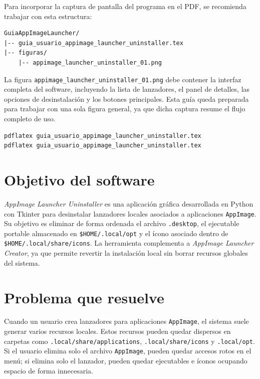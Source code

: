 \documentclass[11pt,a4paper]{article}
\begin{document}
Para incorporar la captura de pantalla del programa en el PDF, se recomienda trabajar con esta estructura:

\begin{lstlisting}[style=textstyle]
GuiaAppImageLauncher/
|-- guia_usuario_appimage_launcher_uninstaller.tex
|-- figuras/
    |-- appimage_launcher_uninstaller_01.png
\end{lstlisting}

La figura \texttt{appimage\_launcher\_uninstaller\_01.png} debe contener la interfaz completa del software, incluyendo la lista de lanzadores, el panel de detalles, las opciones de desinstalación y los botones principales. Esta guía queda preparada para trabajar con una sola figura general, ya que dicha captura resume el flujo completo de uso.

\begin{lstlisting}[style=bashstyle]
pdflatex guia_usuario_appimage_launcher_uninstaller.tex
pdflatex guia_usuario_appimage_launcher_uninstaller.tex
\end{lstlisting}

\section{Objetivo del software}

\textit{AppImage Launcher Uninstaller} es una aplicación gráfica desarrollada en Python con Tkinter para desinstalar lanzadores locales asociados a aplicaciones \texttt{AppImage}. Su objetivo es eliminar de forma ordenada el archivo \texttt{.desktop}, el ejecutable portable almacenado en \texttt{\$HOME/.local/opt} y el ícono asociado dentro de \texttt{\$HOME/.local/share/icons}. La herramienta complementa a \textit{AppImage Launcher Creator}, ya que permite revertir la instalación local sin borrar recursos globales del sistema.

\section{Problema que resuelve}

Cuando un usuario crea lanzadores para aplicaciones \texttt{AppImage}, el sistema suele generar varios recursos locales. Estos recursos pueden quedar dispersos en carpetas como \texttt{.local/share/applications}, \texttt{.local/share/icons} y \texttt{.local/opt}. Si el usuario elimina solo el archivo \texttt{AppImage}, pueden quedar accesos rotos en el menú; si elimina solo el lanzador, pueden quedar ejecutables e íconos ocupando espacio de forma innecesaria.
\end{document}
